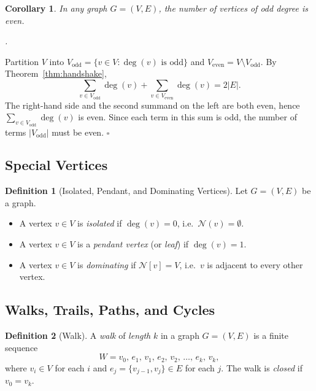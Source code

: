 \documentclass[12pt,a4paper]{article}
\theoremstyle{definition}
\newtheorem{definition}{Definition}[section]
\theoremstyle{plain}
\newtheorem{corollary}{Corollary}[theorem]
\renewenvironment{proof}[1][\proofname]{%
  \par\noindent\textit{#1.}\enspace\ignorespaces
}{%
  \hfill$\square$\par\medskip
}
\newcommand{\N}[1]{\mathcal{N}(#1)}
\newcommand{\Nc}[1]{\mathcal{N}[#1]}
\newcommand{\dg}[1]{\deg(#1)}
\begin{document}
\begin{corollary}\label{cor:odd-degree}
  In any graph \(G = (V,E)\), the number of vertices of odd degree is even.
\end{corollary}

\begin{proof}
  Partition \(V\) into \(V_{\mathrm{odd}} = \{v \in V : \dg{v} \text{ is odd}\}\)
  and \(V_{\mathrm{even}} = V \setminus V_{\mathrm{odd}}\).  By
  Theorem~\ref{thm:handshake},
  \begin{equation}
    \sum_{v \in V_{\mathrm{odd}}} \dg{v}
    + \sum_{v \in V_{\mathrm{even}}} \dg{v} = 2|E|.
    \label{eq:cor-proof}
  \end{equation}
  The right-hand side and the second summand on the left are both even,
  hence \(\sum_{v \in V_{\mathrm{odd}}} \dg{v}\) is even.  Since each term
  in this sum is odd, the number of terms \(|V_{\mathrm{odd}}|\) must be
  even.
\end{proof}

\subsection{Special Vertices}

\begin{definition}[Isolated, Pendant, and Dominating Vertices]
\label{def:special-vertices}
  Let \(G = (V,E)\) be a graph.
  \begin{itemize}
    \item A vertex \(v \in V\) is \emph{isolated} if \(\dg{v} = 0\), i.e.\
          \(\N{v} = \emptyset\).
    \item A vertex \(v \in V\) is a \emph{pendant vertex} (or \emph{leaf})
          if \(\dg{v} = 1\).
    \item A vertex \(v \in V\) is \emph{dominating} if
          \(\Nc{v} = V\), i.e.\ \(v\) is adjacent to every other vertex.
  \end{itemize}
\end{definition}

\subsection{Walks, Trails, Paths, and Cycles}

\begin{definition}[Walk]\label{def:walk}
  A \emph{walk} of \emph{length} \(k\) in a graph \(G = (V,E)\) is a
  finite sequence
  \begin{equation}
    W = v_0,\, e_1,\, v_1,\, e_2,\, v_2,\, \ldots,\, e_k,\, v_k,
    \label{eq:walk}
  \end{equation}
  where \(v_i \in V\) for each \(i\) and \(e_j = \{v_{j-1}, v_j\} \in E\)
  for each \(j\).  The walk is \emph{closed} if \(v_0 = v_k\).
\end{definition}
\end{document}
